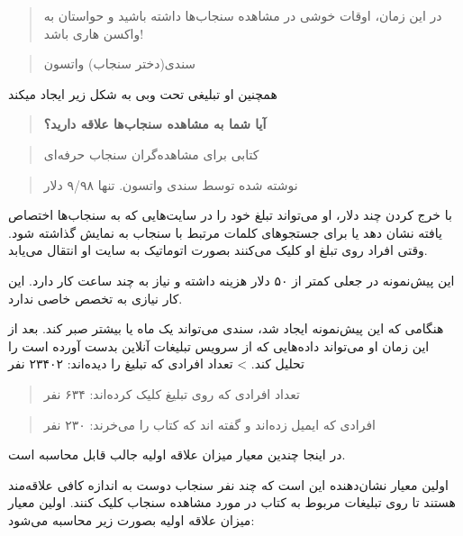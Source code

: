 \begin{quote}
در این زمان، اوقات خوشی در مشاهده سنجاب‌ها داشته باشید و حواستان به
واکسن هاری باشد!
\end{quote}

\begin{quote}
سندی(دختر سنجاب) واتسون
\end{quote}

همچنین او تبلیغی تحت وبی به شکل زیر ایجاد میکند

\begin{quote}
\textbf{آیا شما به مشاهده سنجاب‌ها علاقه دارید؟}
\end{quote}

\begin{quote}
\end{quote}

\begin{quote}
کتابی برای مشاهده‌گران سنجاب حرفه‌ای
\end{quote}

\begin{quote}
نوشته شده توسط سندی واتسون. تنها ۹/۹۸ دلار
\end{quote}

با خرج کردن چند دلار، او می‌تواند تبلغ خود را در سایت‌هایی که به
سنجاب‌ها اختصاص یافته نشان دهد یا برای جستجوهای کلمات مرتبط با سنجاب به
نمایش گذاشته شود. وقتی افراد روی تبلغ او کلیک می‌کنند بصورت اتوماتیک به
سایت او انتقال می‌یابد.

این پیش‌نمونه در جعلی کمتر از ۵۰ دلار هزینه داشته و نیاز به چند ساعت کار
دارد. این کار نیازی به تخصص خاصی ندارد.

هنگامی که این پیش‌نمونه ایجاد شد، سندی می‌تواند یک ماه یا بیشتر صبر کند.
بعد از این زمان او می‌تواند داده‌هایی که از سرویس تبلیغات آنلاین بدست
آورده است را تحلیل کند. \textgreater{} تعداد افرادی که تبلیغ را
دیده‌اند: ۲۳۴۰۲ نفر

\begin{quote}
تعداد افرادی که روی تبلیغ کلیک کرده‌اند: ۶۳۴ نفر
\end{quote}

\begin{quote}
افرادی که ایمیل زده‌اند و گفته اند که کتاب را می‌خرند: ۲۳۰ نفر
\end{quote}

در اینجا چندین معیار میزان علاقه اولیه جالب قابل محاسبه است.

اولین معیار نشان‌دهنده این است که چند نفر سنجاب دوست به اندازه کافی
علاقه‌مند هستند تا روی تبلیغات مربوط به کتاب در مورد مشاهده سنجاب کلیک
کنند. اولین معیار میزان علاقه اولیه بصورت زیر محاسبه می‌شود:

